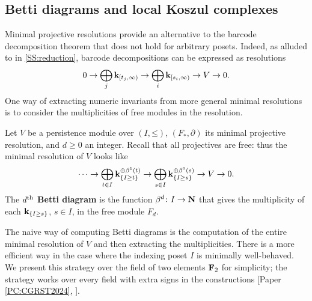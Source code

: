 \subsection{Betti diagrams and local Koszul complexes}

Minimal projective resolutions provide an alternative to the barcode decomposition theorem that does not hold for arbitrary posets. Indeed, as alluded to in \cref{SS:reduction}, barcode decompositions can be expressed as resolutions
\[
0 \to \bigoplus_j \K_{[t_j, \infty)} \to \bigoplus_i \K_{[s_i, \infty)} \to V \to 0.
\]
One way of extracting numeric invariants from more general minimal resolutions is to consider the multiplicities of free modules in the resolution.

\begin{definition}
  Let $V$ be a persistence module over $(I, \mathord{\leq})$, $(F_*, \partial)$ its minimal projective resolution, and $d \geq 0$ an integer. Recall that all projectives are free: thus the minimal resolution of $V$ looks like
  \[
    \cdots \to \bigoplus_{t \in I} \K_{\{I \geq t\}}^{\oplus \beta^1(t)} \to \bigoplus_{s \in I} \K_{\{I \geq s\}}^{\oplus \beta^0(s)} \to V \to 0.
  \]
  The \textbf{$d^{\th}$ Betti diagram} is the function $\beta^d \colon I \to \N$ that gives the multiplicity of each $\K_{\{I \geq s\}}$, $s \in I$, in the free module $F_d$.
\end{definition}

The naive way of computing Betti diagrams is the computation of the entire minimal resolution of $V$ and then extracting the multiplicities. There is a more efficient way in the case where the indexing poset $I$ is minimally well-behaved. We present this strategy over the field of two elements $\bf{F}_2$ for simplicity; the strategy works over every field with extra signs in the constructions [Paper \ref{PC:CGRST2024}, ].

